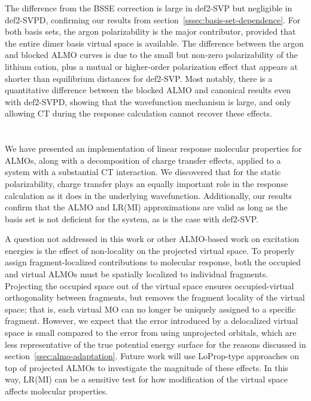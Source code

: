 \documentclass[%
  class = book,%
  crop = false,%
  float = true,%
  multi = true,%
  preview = false,%
]{standalone}
\begin{document}
The difference from the BSSE correction is large in def2-SVP but negligible in def2-SVPD, confirming our results from section~\ref{sssec:basis-set-dependence}. For both basis sets, the argon polarizability is the major contributor, provided that the entire dimer basis virtual space is available. The difference between the argon and blocked ALMO curves is due to the small but non-zero polarizability of the lithium cation, plus a mutual or higher-order polarization effect that appears at shorter than equilibrium distances for def2-SVP. Most notably, there is a quantitative difference between the blocked ALMO and canonical results even with def2-SVPD, showing that the wavefunction mechanism is large, and only allowing CT during the response calculation cannot recover these effects.

\section{\texorpdfstring{}{Conclusions and Future Work}}
\label{sec:conclusions-and-future-work}

We have presented an implementation of linear response molecular properties for ALMOs, along with a decomposition of charge transfer effects, applied to a system with a substantial CT interaction. We discovered that for the static polarizability, charge transfer plays an equally important role in the response calculation as it does in the underlying wavefunction. Additionally, our results confirm that the ALMO and LR(MI) approximations are valid as long as the basis set is not deficient for the system, as is the case with def2-SVP.

A question not addressed in this work or other ALMO-based work on excitation energies\cite{Closser_2015_5791,doi:10.1063/1.4926837} is the effect of non-locality on the projected virtual space. To properly assign fragment-localized contributions to molecular response, both the occupied and virtual ALMOs must be spatially localized to individual fragments. Projecting the occupied space out of the virtual space ensures occupied-virtual orthogonality between fragments, but removes the fragment locality of the virtual space; that is, each virtual MO can no longer be uniquely assigned to a specific fragment. However, we expect that the error introduced by a delocalized virtual space is small compared to the error from using unprojected orbitals, which are less representative of the true potential energy surface for the reasons discussed in section~\ref{ssec:almo-adaptation}. Future work will use LoProp-type approaches on top of projected ALMOs to investigate the magnitude of these effects. In this way, LR(MI) can be a sensitive test for how modification of the virtual space affects molecular properties.
\end{document}
